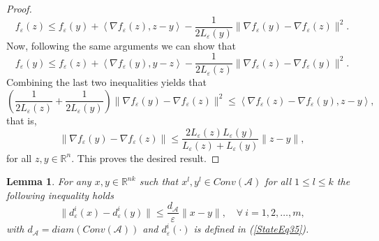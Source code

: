 \documentclass[11pt]{article}
\numberwithin{equation}{section}
\newtheorem{lemma}{Lemma}[proposition]
\begin{document}
\begin{proof}
\begin{equation*}
	f_{\varepsilon}(z) \leq f_{\varepsilon}(y) + \left\langle \nabla f_{\varepsilon}(z), z - y \right\rangle - \frac{1}{2 L_{\varepsilon}(y)} \| \nabla f_{\varepsilon}(y) - \nabla f_{\varepsilon}(z) \|^2 .
\end{equation*}
Now, following the same arguments we can show that
\begin{equation*}
	f_{\varepsilon}(y) \leq f_{\varepsilon}(z) + \left\langle \nabla f_{\varepsilon}(y), y - z \right\rangle - \frac{1}{2 L_{\varepsilon}(z)} \| \nabla f_{\varepsilon}(z) - \nabla f_{\varepsilon}(y) \|^2 .
\end{equation*}
Combining the last two inequalities yields that
\begin{equation*}
	\left( \frac{1}{2 L_{\varepsilon}(z)} + \frac{1}{2 L_{\varepsilon}(y)} \right) \| \nabla f_{\varepsilon}(y) - \nabla f_{\varepsilon}(z) \|^2 \leq \left\langle \nabla f_{\varepsilon}(z) - \nabla f_{\varepsilon}(y), z - y \right\rangle ,
\end{equation*}
that is, 
\begin{equation*}
	\| \nabla f_{\varepsilon}(y) - \nabla f_{\varepsilon}(z) \| \leq \frac{2L_{\varepsilon}(z)L_{\varepsilon}(y)}{L_{\varepsilon}(z) + L_{\varepsilon}(y)} \|z - y\| ,
\end{equation*}
for all $z,y \in \mathbb{R}^n$. This proves the desired result.
\end{proof}

\begin{lemma} \label{StateEq40}
For any $x,y \in \mathbb{R}^{nk}$ such that $x^l,y^l \in Conv(\mathcal{A})$ for all $1 \leq l \leq k$ the following inequality holds 
\begin{equation*}
	\|d_{\varepsilon}^i(x) - d_{\varepsilon}^i(y)\| \leq \frac{ d_{\mathcal{A}}}{\varepsilon}\|x-y\|, \quad \forall \: i=1, 2, \ldots ,m ,
\end{equation*}
with $d_{\mathcal{A}} = diam(Conv(\mathcal{A}))$ and $d^i_{\varepsilon}(\cdot)$ is defined in (\ref{StateEq35}).
\end{lemma}
\end{document}
